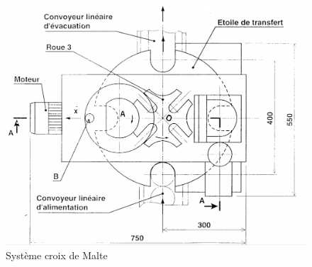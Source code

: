 \begin{figure}
  \centering\includegraphics[width=0.7\linewidth]{img/Indexa2.png}
    \caption{Système croix de Malte}
  \label{img4}
\end{figure}

%
%
%
%
%

